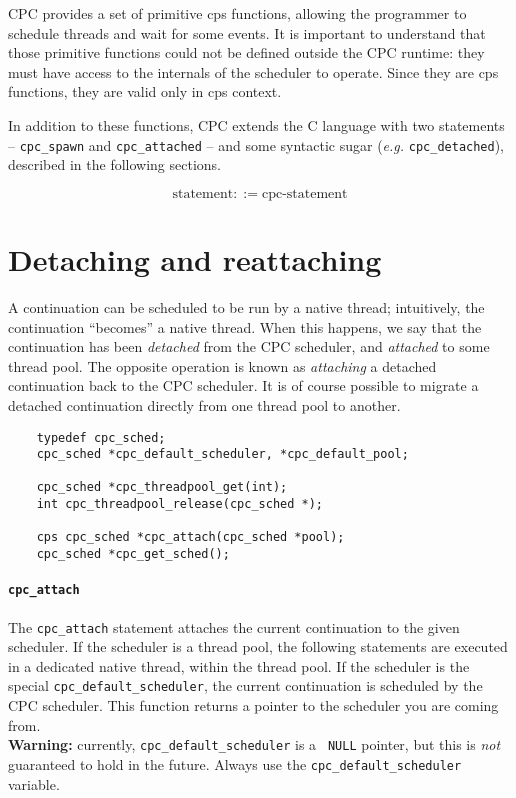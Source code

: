 \documentclass[a4paper]{report}
\begin{document}
CPC provides a set of primitive cps functions, allowing the programmer
to schedule threads and wait for some events.  It is important to
understand that those primitive functions could not be defined outside
the CPC runtime: they must have access to the internals of the scheduler
to operate.  Since they are cps functions, they are valid only in cps
context.

In addition to these functions, CPC extends the C language with two
statements -- \texttt{cpc\_spawn} and \texttt{cpc\_attached} -- and some
syntactic sugar (\textit{e.g.} \texttt{cpc\_detached}), described in the
following sections.

\[ \mbox{statement} ::= \mbox{cpc-statement} \]

\section{Detaching and reattaching} \label{sec:native-threads}

A continuation can be scheduled to be run by a native thread; intuitively,
the continuation ``becomes'' a native thread.  When this happens, we say
that the continuation has been {\em detached\/} from the CPC scheduler,
and {\em attached\/} to some thread pool.  The opposite operation is
known as {\em attaching\/} a detached continuation back to the CPC
scheduler.  It is of course possible to migrate a detached continuation
directly from one thread pool to another.

\begin{verbatim}
    typedef cpc_sched;
    cpc_sched *cpc_default_scheduler, *cpc_default_pool;

    cpc_sched *cpc_threadpool_get(int);
    int cpc_threadpool_release(cpc_sched *);

    cps cpc_sched *cpc_attach(cpc_sched *pool);
    cpc_sched *cpc_get_sched();
\end{verbatim}


\paragraph{\tt cpc\_attach} The {\tt cpc\_attach} statement
attaches the current continuation to the given scheduler.  If the
scheduler is a thread pool, the following statements are executed in a
dedicated native thread, within the thread pool.  If the scheduler is
the special {\tt cpc\_default\_scheduler}, the current continuation is
scheduled by the CPC scheduler.  This function returns a pointer to the
scheduler you are coming from.\\
{\bf Warning:\/} currently, {\tt cpc\_default\_scheduler} is a {\tt
NULL} pointer, but this is {\em not\/} guaranteed to hold in the future.
Always use the {\tt cpc\_default\_scheduler} variable.
\end{document}
